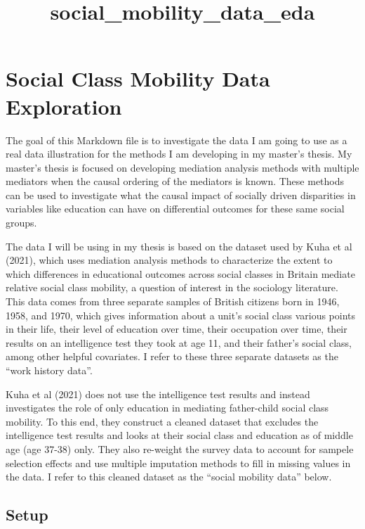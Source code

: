 \documentclass[
]{article}
\title{social\_mobility\_data\_eda}
\author{}
\date{\vspace{-2.5em}}
\begin{document}
\maketitle

\section{Social Class Mobility Data
Exploration}\label{social-class-mobility-data-exploration}

The goal of this Markdown file is to investigate the data I am going to
use as a real data illustration for the methods I am developing in my
master's thesis. My master's thesis is focused on developing mediation
analysis methods with multiple mediators when the causal ordering of the
mediators is known. These methods can be used to investigate what the
causal impact of socially driven disparities in variables like education
can have on differential outcomes for these same social groups.

The data I will be using in my thesis is based on the dataset used by
Kuha et al (2021), which uses mediation analysis methods to characterize
the extent to which differences in educational outcomes across social
classes in Britain mediate relative social class mobility, a question of
interest in the sociology literature. This data comes from three
separate samples of British citizens born in 1946, 1958, and 1970, which
gives information about a unit's social class various points in their
life, their level of education over time, their occupation over time,
their results on an intelligence test they took at age 11, and their
father's social class, among other helpful covariates. I refer to these
three separate datasets as the ``work history data''.

Kuha et al (2021) does not use the intelligence test results and instead
investigates the role of only education in mediating father-child social
class mobility. To this end, they construct a cleaned dataset that
excludes the intelligence test results and looks at their social class
and education as of middle age (age 37-38) only. They also re-weight the
survey data to account for sampele selection effects and use multiple
imputation methods to fill in missing values in the data. I refer to
this cleaned dataset as the ``social mobility data'' below.

\subsection{Setup}\label{setup}
\end{document}
